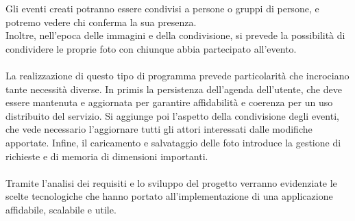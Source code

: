 Gli eventi creati potranno essere condivisi a persone o gruppi di persone, e potremo vedere chi conferma la sua presenza.\\
Inoltre, nell'epoca delle immagini e della condivisione, si prevede la possibilità di condividere le proprie foto con chiunque abbia partecipato all'evento.\\
\\
La realizzazione di questo tipo di programma prevede particolarità che incrociano tante necessità diverse.
In primis la persistenza dell'agenda dell'utente, che deve essere mantenuta e aggiornata per garantire affidabilità e coerenza per un uso distribuito del servizio.
Si aggiunge poi l'aspetto della condivisione degli eventi, che vede necessario l'aggiornare tutti gli attori interessati dalle modifiche apportate.
Infine, il caricamento e salvataggio delle foto introduce la gestione di richieste e di memoria di dimensioni importanti.\\
\\
Tramite l'analisi dei requisiti e lo sviluppo del progetto verranno evidenziate le scelte tecnologiche che hanno portato all'implementazione di una applicazione affidabile, scalabile e utile.  


\newpage
